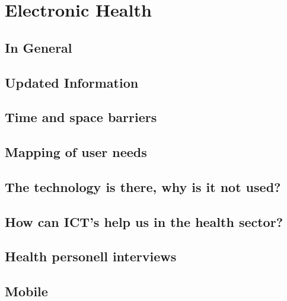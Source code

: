 \chapter{Electronic Health}

\section{In General}

\section{Updated Information}

\section{Time and space barriers}

\section{Mapping of user needs}

\section{The technology is there, why is it not used?}


\section{How can ICT's help us in the health sector?}

\section{Health personell interviews}

\section{Mobile}

